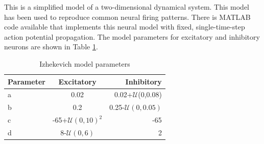 \documentclass[a4paper,11pt]{article}
\begin{document}
This is a simplified model of a two-dimensional dynamical system.
This model has been used to reproduce common neural firing patterns.
There is MATLAB code available \cite{izzy_code} that implements this neural model with fixed, single-time-step action potential propagation.
The model parameters for excitatory and inhibitory neurons are shown in Table \ref{tab:izzy_params}.
\begin{table}[!h]
 \caption{Izhekevich model parameters}
 \label{tab:izzy_params}
 \centering
 \begin{tabular}{l|c|r}
  \textbf{Parameter} & \textbf{Excitatory} & \textbf{Inhibitory} \\
  \hline
  a & 0.02 & 0.02+$\mathcal{U}$(0,0.08) \\
  b & 0.2 & 0.25-$\mathcal{U}(0,0.05)$\\
  c & -65+$\mathcal{U}(0,10)^2$ & -65 \\
  d & 8-$\mathcal{U}(0,6)$& 2 \\
 \end{tabular}

\end{table}
\end{document}
